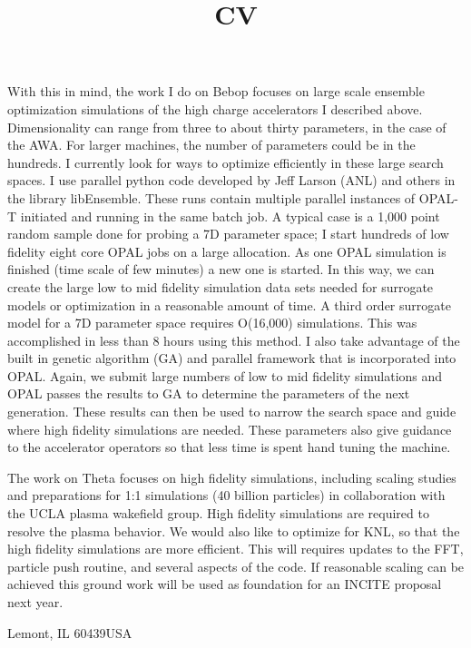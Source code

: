 \documentclass[11pt,a4paper,sans]{moderncv}        %
\begin{document}
With this in mind, the work I do on Bebop focuses on large scale ensemble optimization simulations
of the high charge accelerators I described above.
Dimensionality can range from three to about thirty parameters, 
in the case of the AWA. For larger machines, the number of parameters could be in the 
hundreds. I currently look for ways to optimize efficiently in these large search spaces.
I use parallel python code developed by Jeff Larson (ANL) and others in the library libEnsemble.
These runs contain multiple parallel instances of OPAL-T initiated and running in the same batch job.
A typical case is a 1,000 point random sample done for probing a 7D parameter space;
I start hundreds of low fidelity eight core OPAL jobs on a large allocation.
As one OPAL simulation is finished (time scale of few minutes) a new one is started.
In this way, we can create the large low to mid fidelity simulation data sets needed for surrogate models
or optimization in a reasonable amount of time. 
A third order surrogate model for a 7D parameter space requires O(16,000) simulations. 
This was accomplished in less than 8 hours using this method. I also take advantage of the
built in genetic algorithm (GA) and parallel framework that is incorporated into OPAL.
Again, we submit large numbers of low to mid fidelity simulations and OPAL passes the
results to GA to determine the parameters of the next generation.
These results can then be used to narrow the search space and 
guide where high fidelity simulations are needed.
These parameters also give guidance to the accelerator operators 
so that less time is spent hand tuning the machine.

The work on Theta focuses on high fidelity simulations,
including scaling studies and preparations for 1:1 simulations
(40 billion particles) in collaboration with the UCLA plasma wakefield group.
High fidelity simulations are required to resolve the plasma behavior.
We would also like to optimize for KNL, so that the high fidelity simulations
are more efficient. This will requires updates to the FFT, particle push routine, 
and several aspects of the code. If reasonable scaling can be achieved this
ground work will be used as foundation for an INCITE proposal next year.


\makeletterclosing

\clearpage

\title{CV}                               %
\address{9700 Cass Avenue}{Lemont, IL 60439}{USA}%
\makecvtitle
\end{document}
